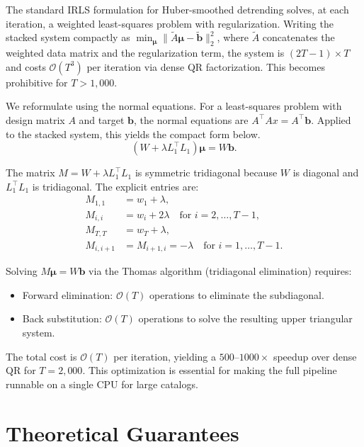 \documentclass[10pt]{article} %
\theoremstyle{plain}
\theoremstyle{definition}
\newcommand{\bvec}{\mathbf{b}}
\begin{document}
The standard IRLS formulation for Huber-smoothed detrending solves, at each iteration, a weighted least-squares problem with regularization. Writing the stacked system compactly as $\min_{\boldsymbol{\mu}} \| \tilde{A} \boldsymbol{\mu} - \tilde{\bvec} \|_2^2$, where $\tilde{A}$ concatenates the weighted data matrix and the regularization term, the system is $(2T-1) \times T$ and costs $\mathcal{O}(T^3)$ per iteration via dense QR factorization. This becomes prohibitive for $T > 1{,}000$.

We reformulate using the normal equations. For a least-squares problem with design matrix $A$ and target $\bvec$, the normal equations are $A^\top A x = A^\top \bvec$. Applied to the stacked system, this yields the compact form below.
\begin{equation}
(W + \lambda L_1^\top L_1) \boldsymbol{\mu} = W \bvec.
\end{equation}

The matrix $M = W + \lambda L_1^\top L_1$ is symmetric tridiagonal because $W$ is diagonal and $L_1^\top L_1$ is tridiagonal. The explicit entries are:
\begin{align}
M_{1,1} &= w_1 + \lambda, \\
M_{i,i} &= w_i + 2\lambda \quad \text{for } i = 2, \dots, T-1, \\
M_{T,T} &= w_T + \lambda, \\
M_{i,i+1} &= M_{i+1,i} = -\lambda \quad \text{for } i = 1, \dots, T-1.
\end{align}

Solving $M \boldsymbol{\mu} = W \bvec$ via the Thomas algorithm (tridiagonal elimination) requires:
\begin{itemize}
\item Forward elimination: $\mathcal{O}(T)$ operations to eliminate the subdiagonal.
\item Back substitution: $\mathcal{O}(T)$ operations to solve the resulting upper triangular system.
\end{itemize}
The total cost is $\mathcal{O}(T)$ per iteration, yielding a $500$--$1000\times$ speedup over dense QR for $T = 2{,}000$. This optimization is essential for making the full pipeline runnable on a single CPU for large catalogs.



\section{Theoretical Guarantees}
\label{app:theory}
\end{document}
